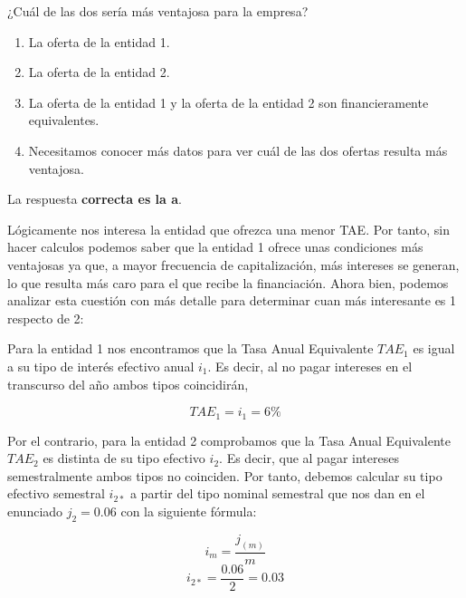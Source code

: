 \documentclass[
  letterpaper,
  DIV=11,
  numbers=noendperiod]{scrreprt}
\begin{document}
¿Cuál de las dos sería más ventajosa para la empresa?

\begin{enumerate}
\def\labelenumi{\alph{enumi})}
\item
  La oferta de la entidad 1.
\item
  La oferta de la entidad 2.
\item
  La oferta de la entidad 1 y la oferta de la entidad 2 son
  financieramente equivalentes.
\item
  Necesitamos conocer más datos para ver cuál de las dos ofertas resulta
  más ventajosa.
\end{enumerate}

\begin{tcolorbox}[enhanced jigsaw, left=2mm, opacityback=0, colback=white, breakable, arc=.35mm, bottomrule=.15mm, rightrule=.15mm, toprule=.15mm, leftrule=.75mm, colframe=quarto-callout-tip-color-frame]
\begin{minipage}[t]{5.5mm}
\textcolor{quarto-callout-tip-color}{\faLightbulb}
\end{minipage}%
\begin{minipage}[t]{\textwidth - 5.5mm}

La respuesta \textbf{correcta es la a}.

Lógicamente nos interesa la entidad que ofrezca una menor TAE. Por
tanto, sin hacer calculos podemos saber que la entidad 1 ofrece unas
condiciones más ventajosas ya que, a mayor frecuencia de capitalización,
más intereses se generan, lo que resulta más caro para el que recibe la
financiación. Ahora bien, podemos analizar esta cuestión con más detalle
para determinar cuan más interesante es 1 respecto de 2:

Para la entidad 1 nos encontramos que la Tasa Anual Equivalente
\(TAE_1\) es igual a su tipo de interés efectivo anual \(i_1\). Es
decir, al no pagar intereses en el transcurso del año ambos tipos
coincidirán,

\[TAE_1=i_1=6\%\]

Por el contrario, para la entidad 2 comprobamos que la Tasa Anual
Equivalente \(TAE_2\) es distinta de su tipo efectivo \(i_2\). Es decir,
que al pagar intereses semestralmente ambos tipos no coinciden. Por
tanto, debemos calcular su tipo efectivo semestral \(i_{2*}\) a partir
del tipo nominal semestral que nos dan en el enunciado \(j_{2}=0.06\)
con la siguiente fórmula:

\[i_m=\frac{j _{(m)}}{m}\] \[i_{2*}=\frac{0.06}{2}=0.03\]


\end{minipage}
\end{tcolorbox}
\end{document}
